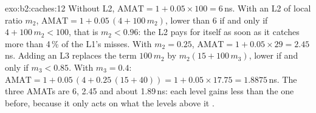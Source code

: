 \begin{solution}{exo:b2:caches:12}
Without L2, $\mathrm{AMAT} = 1 + 0.05 \times 100 = 6$\,ns. With an L2 of local  ratio $m_2$,
$\mathrm{AMAT} = 1 + 0.05\,(4 + 100\,m_2)$, lower than 6 if and only if $4 + 100\,m_2 < 100$, that is
$m_2 < 0.96$: the L2 pays for itself as soon as it catches more than 4\,\% of the L1's misses. With $m_2 = 0.25$,
$\mathrm{AMAT} = 1 + 0.05 \times 29 = 2.45$\,ns. Adding an L3 replaces the term $100\,m_2$ by $m_2(15 + 100\,m_3)$,
lower if and only if $m_3 < 0.85$. With $m_3 = 0.4$:
$\mathrm{AMAT} = 1 + 0.05\,(4 + 0.25\,(15 + 40)) = 1 + 0.05 \times 17.75 = 1.8875$\,ns. The three AMATs are 6, 2.45
and about 1.89\,ns: each level gains less than the one before, because it only acts on what the levels above it .
\end{solution}

